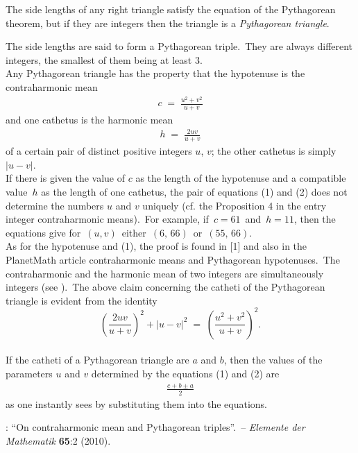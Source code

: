 \documentclass[12pt]{article}
\begin{document}
The side lengths of any right triangle satisfy the equation of the Pythagorean theorem, 
but if they are integers then the triangle is a {\it Pythagorean triangle}.

The side lengths are said to form a Pythagorean triple.\, They are always different 
integers, the smallest of them being at least 3.\\

Any Pythagorean triangle has the property that the hypotenuse is 
the contraharmonic mean 
\begin{align}
c \;=\; \frac{u^2\!+\!v^2}{u\!+\!v}
\end{align}
and one cathetus is the harmonic mean 
\begin{align}
h \;=\; \frac{2uv}{u\!+\!v}
\end{align}
of a certain pair of distinct positive integers $u$, $v$; the
other cathetus is simply $|u\!-\!v|$.\\

If there is given the value of $c$ as the length of the 
hypotenuse and a compatible value\, $h$ as the length of one 
cathetus, the pair of equations (1) and (2) does not determine 
the numbers $u$ and $v$ uniquely (cf. the Proposition 4 in the 
entry integer contraharmonic means).\, For example, if\, 
$c = 61$\, and\, $h = 11$, then the equations give for\, 
$(u, v)$\, either\, $(6,\,66)$\, or\, $(55,\,66)$.\\


As for the hypotenuse and (1), the proof is found in [1] and also 
in the PlanetMath article contraharmonic means and Pythagorean 
hypotenuses.\, The contraharmonic and the harmonic mean of two 
integers are simultaneously integers (see 
).\, The above 
claim concerning the catheti of the Pythagorean triangle is 
evident from the identity
$$\left(\frac{2uv}{u\!+\!v}\right)^2\!+\!\left|u\!-\!v\right|^2 
\;=\; \left(\frac{u^2\!+\!v^2}{u\!+\!v}\right)^2.$$\\


If the catheti of a Pythagorean triangle are $a$ and $b$,
then the values of the parameters $u$ and $v$ determined by 
the equations (1) and (2) are
\begin{align}
\frac{c\!+\!b\!\pm\!a}{2}
\end{align}
as one instantly sees by substituting them into the equations.


\begin{thebibliography}{8}
: ``On contraharmonic mean and Pythagorean triples''.\, -- \emph{Elemente der Mathematik} \textbf{65}:2 (2010).
\end{thebibliography}
\end{document}
